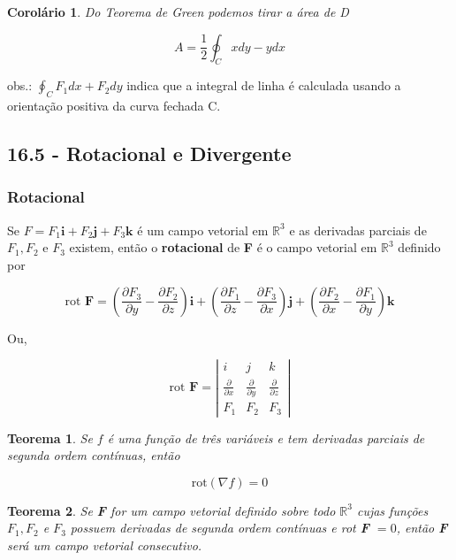 \documentclass[12pt]{article}
\newtheorem{theorem}{Teorema}[section]
\newtheorem{corollary}{Corolário}[theorem]
\begin{document}
\begin{corollary}
    Do Teorema de Green podemos tirar a área de D
    
    $$A = \dfrac{1}{2} \oint_C x d y - y d x$$
\end{corollary}

obs.: $\oint_C F_1 d x + F_2 d y$ indica que a integral de linha é calculada usando a orientação positiva da curva fechada C.

\subsection*{16.5 - Rotacional e Divergente}
\subsubsection*{Rotacional}
Se $F = F_1 \textbf{i} + F_2 \textbf{j} + F_3 \textbf{k}$ é um campo vetorial em $\mathbb{R}^3$ e as derivadas parciais de $F_1, F_2$ e $F_3$ existem, então o \textbf{rotacional} de \textbf{F} é o campo vetorial em $\mathbb{R}^3$ definido por

$$\text{rot } \textbf{F} = \left( \dfrac{\partial F_3}{\partial y} - \dfrac{\partial F_2}{\partial z} \right) \textbf{i} + \left( \dfrac{\partial F_1}{\partial z} - \dfrac{\partial F_3}{\partial x} \right) \textbf{j} + \left( \dfrac{\partial F_2}{\partial x} - \dfrac{\partial F_1}{\partial y} \right) \textbf{k}$$

Ou,

$$\text{rot } \textbf{F} = \left| \begin{array}{ccc}
    i & j & k \\
    \frac{\partial}{\partial x} & \frac{\partial}{\partial y} & \frac{\partial}{\partial z} \\
    F_1 & F_2 & F_3
\end{array} \right|$$

\begin{theorem}
    Se $f$ é uma função de três variáveis e tem derivadas parciais de segunda ordem contínuas, então

    $$\text{rot} (\nabla f) = 0$$
\end{theorem}

\begin{theorem}
    Se \textbf{F} for um campo vetorial definido sobre todo $\mathbb{R}^3$ cujas funções $F_1, F_2$ e $F_3$ possuem derivadas de segunda ordem contínuas e rot \textbf{F} $ = 0$, então \textbf{F} será um campo vetorial consecutivo.
\end{theorem}
\end{document}
